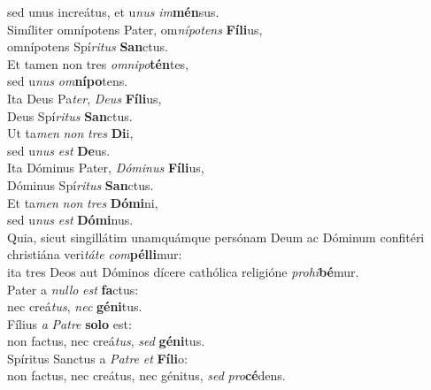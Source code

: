 \evenverse sed unus increátus, et u\textit{nus} \textit{im}\textbf{mén}sus.\\
\oddverse Simíliter omnípotens Pater, om\textit{ní}\textit{po}\textit{tens} \textbf{Fí}\textbf{li}us,~\*\\
\oddverse omnípotens Spí\textit{ri}\textit{tus} \textbf{San}ctus.\\
\evenverse Et tamen non tres \textit{om}\textit{ni}\textit{po}\textbf{tén}tes,~\*\\
\evenverse sed u\textit{nus} \textit{om}\textbf{ní}\textbf{po}tens.\\
\oddverse Ita Deus Pa\textit{ter}, \textit{De}\textit{us} \textbf{Fí}\textbf{li}us,~\*\\
\oddverse Deus Spí\textit{ri}\textit{tus} \textbf{San}ctus.\\
\evenverse Ut ta\textit{men} \textit{non} \textit{tres} \textbf{Di}i,~\*\\
\evenverse sed u\textit{nus} \textit{est} \textbf{De}us.\\
\oddverse Ita Dóminus Pater, \textit{Dó}\textit{mi}\textit{nus} \textbf{Fí}\textbf{li}us,~\*\\
\oddverse Dóminus Spí\textit{ri}\textit{tus} \textbf{San}ctus.\\
\evenverse Et ta\textit{men} \textit{non} \textit{tres} \textbf{Dó}\textbf{mi}ni,~\*\\
\evenverse sed u\textit{nus} \textit{est} \textbf{Dó}\textbf{mi}nus.\\
\oddverse Quia, sicut singillátim unamquámque persónam Deum ac Dóminum confitéri christiána veri\textit{tá}\textit{te} \textit{com}\textbf{pél}\textbf{li}mur:~\*\\
\oddverse ita tres Deos aut Dóminos dícere cathólica religióne \textit{pro}\textit{hi}\textbf{bé}mur.\\
\evenverse Pater a \textit{nul}\textit{lo} \textit{est} \textbf{fa}ctus:~\*\\
\evenverse nec creá\textit{tus}, \textit{nec} \textbf{gé}\textbf{ni}tus.\\
\oddverse Fílius \textit{a} \textit{Pa}\textit{tre} \textbf{so}\textbf{lo} est:~\*\\
\oddverse non factus, nec creá\textit{tus}, \textit{sed} \textbf{gé}\textbf{ni}tus.\\
\evenverse Spíritus Sanctus a \textit{Pa}\textit{tre} \textit{et} \textbf{Fí}\textbf{li}o:~\*\\
\evenverse non factus, nec creátus, nec génitus, \textit{sed} \textit{pro}\textbf{cé}dens.\\
